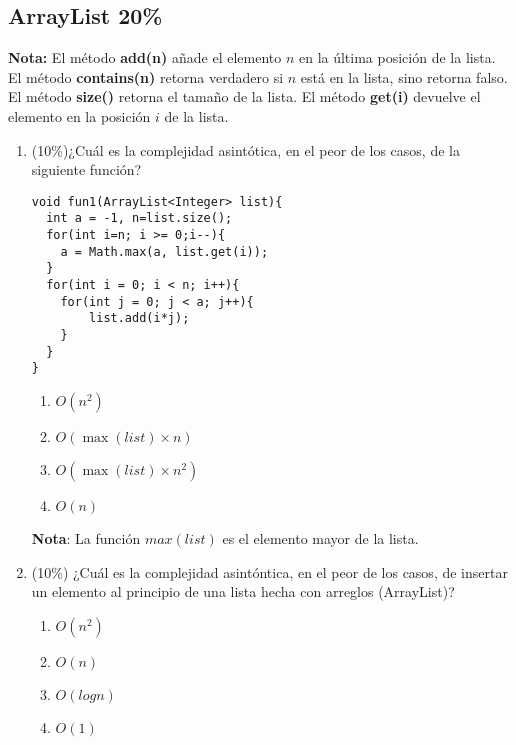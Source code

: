 \documentclass[10 pt]{article}
\begin{document}
\begin{multicols}{2}
\section{ArrayList 20\%}
\textbf{Nota: } El método \textbf{add(n)} añade el elemento $n$ en la última posición de la lista. El método \textbf{contains(n)} retorna verdadero si $n$ está en la lista, sino retorna falso. El método \textbf{size()} retorna el tamaño de la lista. El método \textbf{get(i)} devuelve el elemento en la posición $i$ de la lista. 
\begin{enumerate}[label=\alph*]
\item (10\%)¿Cuál es la complejidad asintótica, en el peor de los casos, de la siguiente función?
\begin{lstlisting}
void fun1(ArrayList<Integer> list){
  int a = -1, n=list.size();
  for(int i=n; i >= 0;i--){
  	a = Math.max(a, list.get(i));
  }
  for(int i = 0; i < n; i++){
  	for(int j = 0; j < a; j++){
  		list.add(i*j);
  	}
  }
}
\end{lstlisting}

\begin{enumerate}[label=(\roman*)]
\item $O(n^2)$
\item $O(\max(list) \times n)$
\item $O(\max(list) \times n^2)$
\item $O(n)$
\end{enumerate}
\textbf{Nota}: La función $max(list)$ es el elemento mayor de la lista.
\item (10\%) ¿Cuál es la complejidad asintóntica, en el peor de los casos, de insertar
un elemento al principio de una lista hecha con arreglos (ArrayList)?
\begin{enumerate}[label=(\roman*)]
\item $O(n^2)$
\item $O(n )$
\item $O(log n)$
\item $O(1)$
\end{enumerate}
\end{enumerate}
\end{multicols}
\end{document}
